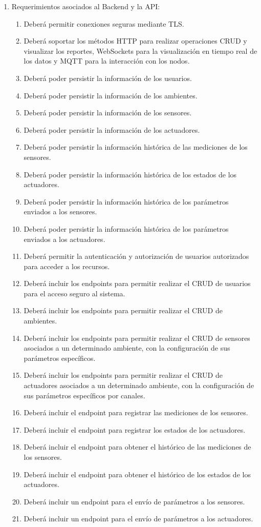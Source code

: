 \begin{enumerate}
	\item Requerimientos asociados al Backend y la API:
	      \begin{enumerate}
		      \item Deberá permitir conexiones seguras mediante TLS.
		      \item Deberá soportar los métodos HTTP para realizar operaciones CRUD y visualizar los reportes, WebSockets
		            para la visualización en tiempo real de los datos y MQTT para la interacción con los nodos.
			  \item Deberá poder persistir la información de los usuarios.
			  \item Deberá poder persistir la información de los ambientes.
			  \item Deberá poder persistir la información de los sensores.
			  \item Deberá poder persistir la información de los actuadores.
			  \item Deberá poder persistir la información histórica de las mediciones de los sensores.
			  \item Deberá poder persistir la información histórica de los estados de los actuadores.
			  \item Deberá poder persistir la información histórica de los parámetros enviados a los sensores.
			  \item Deberá poder persistir la información histórica de los parámetros enviados a los actuadores.
		      \item Deberá permitir la autenticación y autorización de usuarios autorizados para acceder a los recursos.
		      \item Deberá incluir los endpoints para permitir realizar el CRUD de usuarios para el acceso seguro al sistema.
		      \item Deberá incluir los endpoints para permitir realizar el CRUD de ambientes.
		      \item Deberá incluir los endpoints para permitir realizar el CRUD de sensores asociados a un determinado ambiente, 
			  con la configuración de sus parámetros específicos.
		      \item Deberá incluir los endpoints para permitir realizar el CRUD de actuadores asociados a un determinado ambiente, 
			  con la configuración de sus parámetros específicos por canales.
		      \item Deberá incluir el endpoint para registrar las mediciones de los sensores.
		      \item Deberá incluir el endpoint para registrar los estados de los actuadores.
		      \item Deberá incluir el endpoint para obtener el histórico de las mediciones de los sensores.
		      \item Deberá incluir el endpoint para obtener el histórico de los estados de los actuadores.
		      \item Deberá incluir un endpoint para el envío de parámetros a los sensores.
		      \item Deberá incluir un endpoint para el envío de parámetros a los actuadores.
	      \end{enumerate}


\end{enumerate}
